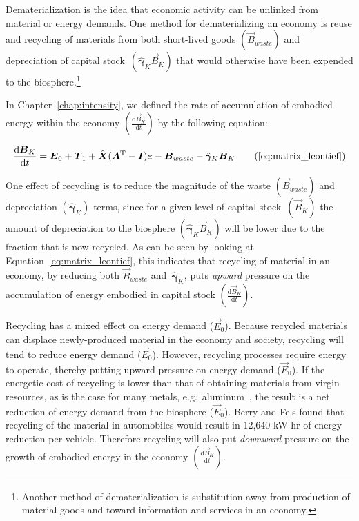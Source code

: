 Dematerialization is the idea that economic activity can be unlinked 
from material or energy demands.\cite{FischerKowalski:2011uo} 
One method for dematerializing an economy 
is reuse and recycling of materials from both
short-lived goods
$\left(\vec{B}_{waste}\right)$
and depreciation of 
capital 
stock~$\left(\hat{\bm{\gamma}}_{K}\vec{B}_{K}\right)$
that would otherwise have
been expended to the biosphere.\footnote{Another 
method  of dematerialization is 
substitution away from production of material goods 
and toward information and services
in an economy.}

In Chapter~\ref{chap:intensity},
we defined the rate of accumulation 
of embodied energy within the economy
$\left(\frac{\mathrm{d}\vec{B}_{K}}{\mathrm{d}t}\right)$
by the following equation:

\begin{equation}
	\frac{\mathrm{d}\vec{B}_{K}}{\mathrm{d}t} 
	= \vec{E}_{0}
	+ \vec{T}_{1}
	+ \hat{\vec{X}} (\vec{A}^{\mathrm{T}} - \vec{I})\bm{\varepsilon} 
	- \vec{B}_{waste}
	- \hat{\bm{\gamma}}_{K}\vec{B}_{K}\tag{\ref{eq:matrix_leontief}}
\end{equation}

One effect of recycling is to reduce the magnitude 
of the waste 
$\left(\vec{B}_{waste}\right)$
and depreciation 
$\left(\hat{\bm{\gamma}}_{K}\right)$ 
terms,
since for a given level of capital 
stock~$\left(\vec{B}_{K}\right)$
the amount of depreciation to the 
biosphere $\left(\hat{\bm{\gamma}}_{K}\vec{B}_{K}\right)$
will be lower due to the fraction that
is now recycled.
As can be seen by looking at 
Equation~\ref{eq:matrix_leontief},
this indicates that 
recycling of material in an economy, 
by reducing both $\vec{B}_{waste}$ 
and~$\hat{\bm{\gamma}}_{K}$, 
puts \emph{upward} pressure on the accumulation of 
energy embodied in capital stock
$\left(\frac{\mathrm{d}\vec{B}_{K}}{\mathrm{d}t}\right)$.

Recycling has a mixed effect on energy demand ($\vec{E}_{0}$). 
Because recycled materials can displace newly-produced material 
in the economy and society, 
recycling will tend to reduce energy demand ($\vec{E}_{0}$). 
However, recycling processes require energy to operate, 
thereby putting upward pressure on energy demand ($\vec{E}_{0}$). 
If the energetic cost of recycling is lower than that of obtaining materials
from virgin resources, as is the case for many metals, 
e.g.\ aluminum~\cite{Chapman1975}, 
the result is a net reduction of energy demand 
from the biosphere ($\vec{E}_{0}$). 
Berry and Fels found that recycling of the material in automobiles
would result in 12,640 kW-hr of energy reduction per vehicle.\cite[p. 15]{Berry:1973vo}
Therefore recycling will also put \emph{downward} pressure on 
the growth of embodied energy in the economy
$\left(\frac{\mathrm{d}\vec{B}_{K}}{\mathrm{d}t}\right)$. 

